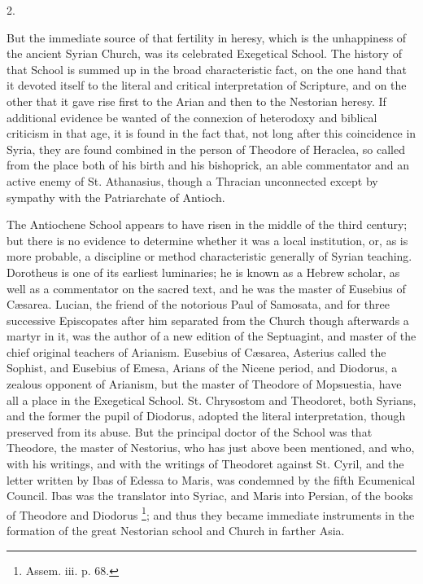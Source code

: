 2.

But the immediate source of that fertility in heresy, which is the
unhappiness of the ancient Syrian Church, was its celebrated
Exegetical School. The history of that School is summed up in the
broad characteristic fact, on the one hand that it devoted itself to
the literal and critical interpretation of Scripture, and on the other
that it gave rise first to the Arian and then to the Nestorian heresy.
If additional evidence be wanted of the connexion of heterodoxy and
biblical criticism in that age, it is found in the fact that, not long
after this coincidence in Syria, they are found combined in the person
of Theodore of Heraclea, so called from the place both of his birth
and his bishoprick, an able commentator and an active enemy of St.
Athanasius, though a Thracian unconnected except by sympathy with the
Patriarchate of Antioch.

The Antiochene School appears to have risen in the middle of the
third century; but there is no evidence to determine whether it was a
local institution, or, as is more probable, a discipline or method
characteristic generally of Syrian teaching. Dorotheus is one of its
earliest luminaries; he is known as a Hebrew scholar, as well as a
commentator on the sacred text, and he was the master of Eusebius of
Cæsarea. Lucian, the friend of the notorious Paul of Samosata, and
for three successive Episcopates after him separated from the Church
though afterwards a martyr in it, was the author of a new edition of
the Septuagint, and master of the chief original teachers of Arianism.
Eusebius of Cæsarea, Asterius called the Sophist, and Eusebius of
Emesa, Arians of the Nicene period, and Diodorus, a zealous opponent
of Arianism, but the master of Theodore of Mopsuestia, have all a
place in the Exegetical School. St. Chrysostom and Theodoret, both
Syrians, and the former the pupil of Diodorus, adopted the literal
interpretation, though preserved from its abuse. But the principal
doctor of the School was that Theodore, the master of Nestorius, who
has just above been mentioned, and who, with his writings, and with
the writings of Theodoret against St. Cyril, and the letter written by
Ibas of Edessa to Maris, was condemned by the fifth Ecumenical
Council. Ibas was the translator into Syriac, and Maris into Persian,
of the books of Theodore and Diodorus \footnote{Assem. iii. p. 68.}; and thus they became immediate instruments in the formation
of the great Nestorian school and Church in farther Asia.

